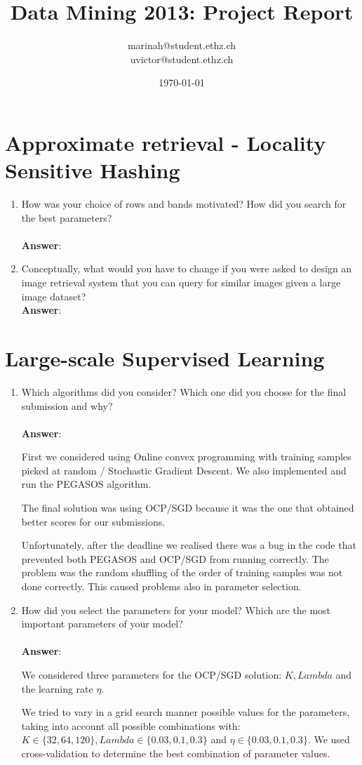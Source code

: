 \documentclass[11pt]{article}
\title{Data Mining 2013: Project Report}
\author{marinah@student.ethz.ch\\ uvictor@student.ethz.ch\\}
\date{\today}
\begin{document}
\maketitle

\section{Approximate retrieval - Locality Sensitive Hashing}
\begin{enumerate}
\item How was your choice of rows and bands motivated? How did you search for the
best parameters? \\ \\
\textbf{Answer}:

\item Conceptually, what would you have to change if you were asked to design an image
  retrieval system that you can query for similar images given a large image
  dataset? \\

\textbf{Answer}:

\end{enumerate}

\section{Large-scale Supervised Learning}

\begin{enumerate}
\item Which algorithms did you consider? Which one did you choose for the
  final submission and why? \\ \\
\textbf{Answer}:

First we considered using Online convex programming with training samples picked at random / Stochastic Gradient Descent. We also implemented and run
the PEGASOS algorithm. 

The final solution was using OCP/SGD because it was the one that obtained better scores for our submissions. 

Unfortunately, after the deadline we realised there was a bug in the code that prevented both PEGASOS and OCP/SGD from running correctly. The problem
was the random shuffling of the order of training samples was not done correctly. This caused problems also in parameter selection.

\item How did you select the parameters for your model? Which are the
  most important parameters of your model? \\ \\
\textbf{Answer}:

We considered three parameters for the OCP/SGD solution: $K, Lambda$ and the learning rate $\eta$.

We tried to vary in a grid search manner possible values for the parameters, taking into account all possible combinations with: $K \in \{32, 64, 120\}, Lambda \in \{0.03, 0.1, 0.3\}$ and $\eta \in \{0.03, 0.1, 0.3\}$. We used cross-validation to determine the best combination of parameter values.

\end{enumerate}
\end{document}
